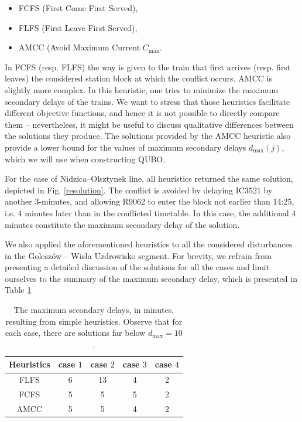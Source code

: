 \begin{itemize}
  \item FCFS (First Come First Served),
  \item FLFS (First Leave First Served),
  \item AMCC (Avoid Maximum Current $C_{\max}$.
\end{itemize}

In FCFS (resp. FLFS) the way is given to the train that first arrives (resp.
first leaves) the considered station block at which the conflict occurs. AMCC
\cite{mascis2002job} is slightly more complex. In this heuristic, one tries to
minimize the maximum secondary delays of the trains. We want to stress that
those heuristics facilitate different objective functions, and hence it is not
possible to directly compare them -- nevertheless, it might be useful to
discuss qualitative differences between the solutions they produce. The
solutions provided by the AMCC heuristic also provide a lower bound for the
values of maximum secondary delays $d_{\max}(j)$, which we will use when
constructing QUBO.

For the case of Nidzica--Olsztynek line, all heuristics returned the same
solution, depicted in Fig. \ref{resolution}. The conflict is avoided by
delaying IC3521 by another 3-minutes, and allowing R9062 to enter the block not
earlier than 14:25, i.e. 4 minutes later than in the conflicted timetable. In
this case, the additional 4 minutes constitute the maximum secondary delay of
the solution.

We also applied the aforementioned heuristics to all the considered
disturbances in the Goleszów -- Wisła Uzdrowisko segment. For brevity, we
refrain from presenting a detailed discussion of the solutions for all the
cases and limit ourselves to the summary of the maximum secondary delay, which
is presented in Table \ref{tab:simple}

\begin{table}[bh]
  \centering
  \begin{tabular}{|c|c|c|c|c|}
    \hline
    \rowcolor{theader} Heuristics & case $1$ & case $2$ & case $3$ & case $4$ \\
    \hline
    FLFS                          & 6        & 13       & 4        & 2        \\
    \hline
    FCFS                          & 5        & 5        & 5        & 2        \\
    \hline
    AMCC                          & 5        & 5        & 4        & 2        \\
    \hline
  \end{tabular}
  \caption{The maximum secondary delays, in minutes, resulting from simple heuristics.
    Observe that for each case, there are solutions far below $d_{\text{max}} =
      10$.} \label{tab:simple}
\end{table}

